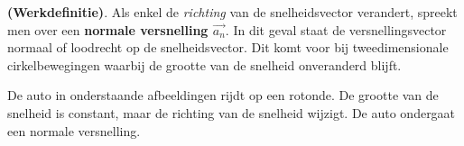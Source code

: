 \documentclass{ximera}
\begin{document}
\begin{definition}{\textbf{(Werkdefinitie)}.}
Als enkel de \textit{richting} van de snelheidsvector verandert, spreekt men over een \textbf{normale versnelling \(\vec{a_n}\)}. 
In dit geval staat de versnellingsvector normaal of loodrecht op de snelheidsvector. Dit komt voor bij tweedimensionale cirkelbewegingen waarbij de grootte van de snelheid onveranderd blijft.
\end{definition}

\begin{example}
De auto in onderstaande afbeeldingen rijdt op een rotonde. De grootte van de snelheid is constant, maar de richting van de snelheid wijzigt. 
De auto ondergaat een normale versnelling. 

\begin{image}
	
\end{image}
\end{example}
\end{document}
